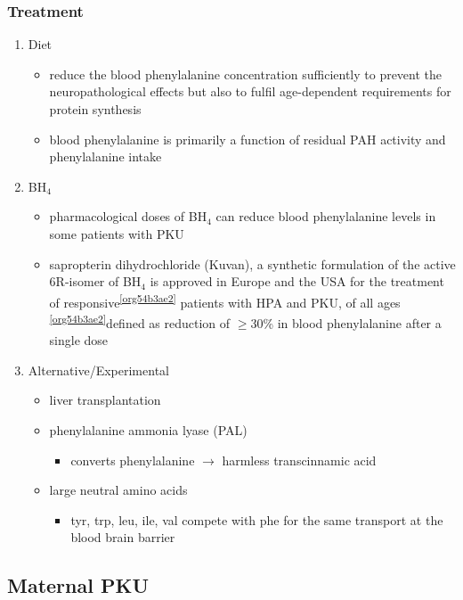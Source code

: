 \documentclass{scrartcl}
\begin{document}
\subsubsection{Treatment}
\label{sec:orga31606f}
\begin{enumerate}
\item Diet
\label{sec:org0c40cad}
\begin{itemize}
\item reduce the blood phenylalanine concentration sufficiently to prevent the
neuropathological effects but also to fulfil age-dependent
requirements for protein synthesis
\item blood phenylalanine is primarily a function of residual PAH activity and phenylalanine
intake
\end{itemize}
\item BH\(_{\text{4}}\)
\label{sec:org65b2b1a}
\begin{itemize}
\item pharmacological doses of BH\(_{\text{4}}\) can reduce blood phenylalanine levels
in some patients with PKU
\item sapropterin dihydrochloride (Kuvan), a synthetic formulation of the
active 6R-isomer of BH\(_{\text{4}}\) is approved in Europe and the USA for the
treatment of responsive\textsuperscript{\ref{org54b3ae2}} patients with HPA and PKU, of all
ages \textsuperscript{\ref{org54b3ae2}}defined as reduction of \(\ge\)30\% in blood phenylalanine
after a single dose
\end{itemize}
\item Alternative/Experimental
\label{sec:orgdc750b3}
\begin{itemize}
\item liver transplantation
\item phenylalanine ammonia lyase (PAL)
\begin{itemize}
\item converts phenylalanine \(\to\) harmless transcinnamic acid
\end{itemize}
\item large neutral amino acids
\begin{itemize}
\item tyr, trp, leu, ile, val compete with phe for the same transport at
the blood brain barrier
\end{itemize}
\end{itemize}
\end{enumerate}

\subsection{Maternal PKU}
\label{sec:org5dbf27f}
\end{document}

